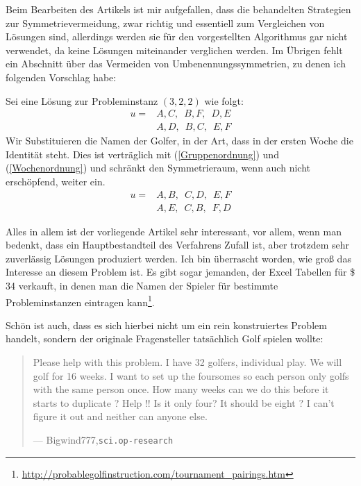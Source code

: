 Beim Bearbeiten des Artikels ist mir aufgefallen, dass die behandelten Strategien zur Symmetrievermeidung, zwar richtig und essentiell zum Vergleichen von Lösungen sind, 
allerdings werden sie für den vorgestellten Algorithmus gar nicht verwendet, da keine Lösungen miteinander verglichen werden. 
Im Übrigen fehlt ein Abschnitt über das Vermeiden von Umbenennungssymmetrien, zu denen ich folgenden Vorschlag habe:

Sei eine Lösung zur Probleminstanz $(3,2,2)$ wie folgt:
\begin{equation}
\begin{split} 
  u =& A, C,\enspace B, F,\enspace D, E \\
    &  A, D, \enspace B, C, \enspace E, F
\end{split}
\end{equation}
Wir Substituieren die Namen der Golfer, in der Art, dass in der ersten Woche die Identität steht. 
Dies ist verträglich mit (\ref{Gruppenordnung}) und (\ref{Wochenordnung}) und schränkt den Symmetrieraum, wenn auch nicht erschöpfend, weiter ein.
\begin{equation}
\begin{split} 
  u =& A, B,\enspace C, D,\enspace E, F \\
    &  A, E, \enspace C, B, \enspace F, D
\end{split}
\end{equation}

Alles in allem ist der vorliegende Artikel sehr interessant, vor allem, wenn man bedenkt, dass ein Hauptbestandteil des Verfahrens Zufall ist, aber trotzdem sehr zuverlässig Lösungen produziert werden.
Ich bin überrascht worden, wie groß das Interesse an diesem Problem ist. 
Es gibt sogar jemanden, der Excel Tabellen für \$ 34 verkauft, in denen man die Namen der Spieler für bestimmte Probleminstanzen eintragen kann\footnote{\url{http://probablegolfinstruction.com/tournament_pairings.htm}}.

Schön ist auch, dass es sich hierbei nicht um ein rein konstruiertes Problem handelt, sondern der originale Fragensteller tatsächlich Golf spielen wollte:
\begin{quote}
Please help with this problem.
I have 32 golfers, individual play.
We will golf for 16 weeks.
I want to set up the foursomes so each person only golfs
with the same person once.
How many weeks can we do this before it starts to duplicate ?
Help !!
Is it only four?
It should be eight ?
I can't figure it out and neither can anyone else.
\par\raggedleft--- \textup{Bigwind777},\quad \texttt{sci.op-research}
\end{quote}

